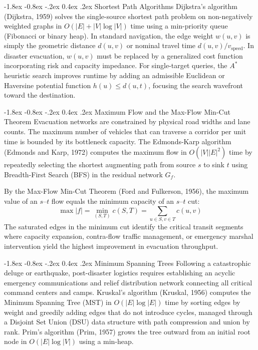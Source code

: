 \documentclass[12pt,oneside]{report}
\makeatletter
\renewcommand{\subsection}{\@startsection{subsection}{2}{\z@}%
  {-1.8ex \@plus -0.8ex \@minus -.2ex}%
  {0.4ex \@plus .2ex}%
  {\normalfont\normalsize\bfseries}}
\makeatother
\begin{document}
\subsection{Shortest Path Algorithms}
Dijkstra's algorithm (Dijkstra, 1959) solves the single-source shortest path problem on non-negatively weighted graphs in $O(|E| + |V| \log |V|)$ time using a min-priority queue (Fibonacci or binary heap). In standard navigation, the edge weight $w(u, v)$ is simply the geometric distance $d(u, v)$ or nominal travel time $d(u, v) / v_{\text{speed}}$. In disaster evacuation, $w(u, v)$ must be replaced by a generalized cost function incorporating risk and capacity impedance. For single-target queries, the $A^*$ heuristic search improves runtime by adding an admissible Euclidean or Haversine potential function $h(u) \le d(u, t)$, focusing the search wavefront toward the destination.

\subsection{Maximum Flow and the Max-Flow Min-Cut Theorem}
Evacuation networks are constrained by physical road widths and lane counts. The maximum number of vehicles that can traverse a corridor per unit time is bounded by its bottleneck capacity. The Edmonds-Karp algorithm (Edmonds and Karp, 1972) computes the maximum flow in $O(|V| |E|^2)$ time by repeatedly selecting the shortest augmenting path from source $s$ to sink $t$ using Breadth-First Search (BFS) in the residual network $G_f$. 

By the Max-Flow Min-Cut Theorem (Ford and Fulkerson, 1956), the maximum value of an $s$--$t$ flow equals the minimum capacity of an $s$--$t$ cut:
\begin{equation}
    \max |f| = \min_{(S, T)} c(S, T) = \sum_{u \in S, v \in T} c(u, v)
\end{equation}
The saturated edges in the minimum cut identify the critical transit segments where capacity expansion, contra-flow traffic management, or emergency marshal intervention yield the highest improvement in evacuation throughput.

\subsection{Minimum Spanning Trees}
Following a catastrophic deluge or earthquake, post-disaster logistics requires establishing an acyclic emergency communications and relief distribution network connecting all critical command centers and camps. Kruskal's algorithm (Kruskal, 1956) computes the Minimum Spanning Tree (MST) in $O(|E| \log |E|)$ time by sorting edges by weight and greedily adding edges that do not introduce cycles, managed through a Disjoint Set Union (DSU) data structure with path compression and union by rank. Prim's algorithm (Prim, 1957) grows the tree outward from an initial root node in $O(|E| \log |V|)$ using a min-heap.
\end{document}

